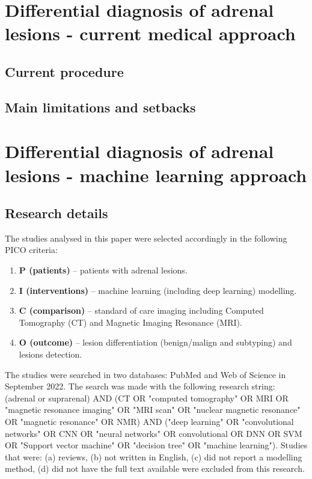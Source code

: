 \documentclass{article}
\begin{document}
\section{Differential diagnosis of adrenal lesions - current medical approach}

\subsection{Current procedure}

\subsection{Main limitations and setbacks}

\section{Differential diagnosis of adrenal lesions - machine learning approach}

\subsection{Research details}

The studies analysed in this paper were selected accordingly in the following PICO criteria:

\begin{enumerate}
    \item[] \textbf{P (patients) }– patients with adrenal lesions.
    \item[] \textbf{I (interventions) }– machine learning (including deep learning) modelling.
    \item[] \textbf{C (comparison) }– standard of care imaging including Computed Tomography (CT) and Magnetic Imaging Resonance (MRI).
    \item[] \textbf{O (outcome) }– lesion differentiation (benign/malign and subtyping) and lesions detection.
\end{enumerate}

The studies were searched in two databases: PubMed and Web of Science in
September 2022. The search was made with the following research string: (adrenal
or suprarenal) AND (CT OR "computed tomography" OR MRI OR "magnetic resonance
imaging" OR "MRI scan" OR "nuclear magnetic resonance" OR "magnetic resonance"
OR NMR) AND ("deep learning" OR "convolutional networks" OR CNN OR "neural
networks" OR convolutional OR DNN OR SVM OR "Support vector machine" OR
"decision tree" OR "machine learning"). Studies that were: (a) reviews, (b) not
written in English, (c) did not report a modelling method, (d) did not have the
full text available were excluded from this research.
\end{document}

